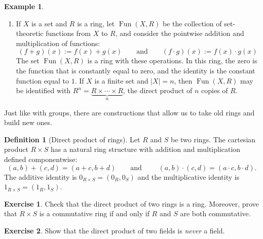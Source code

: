 \documentclass[12pt]{report}
\numberwithin{equation}{section}
\numberwithin{theorem}{chapter}
\theoremstyle{definition}
\newtheorem{definition}[theorem]{Definition}
\newtheorem{example}[theorem]{Example}
\newtheorem{exercise}{Exercise}
\newtheorem*{basic properties}{Basic Properties}
\newtheorem*{Important Remark}{Important Remark}
\newcommand{\df}[1]{{\bf #1}\index{#1}}
\DeclareMathOperator{\Fun}{Fun}
\begin{document}
\begin{example}
\begin{enumerate}[itemsep=0.2em,leftmargin=20pt]
This ring $\mathcal{H}$ is a division ring, since one can check that
$$(a + bi + cj + dk)^{-1} = \frac{a -  bi -  cj - dk}{\|a + bi + cj + dk\|}$$
where
$$\|a + bi + cj + dk \| := a^2 + b^2 + c^2 + d^2.$$
In the equation above, $\|a + bi + cj + dk \|$ is a nonzero real number if $a + bi + cj + dk$ is not the zero element. The quantity $\|a + bi + cj + dk \|$ is called the \df{norm} of the quaternion $a + bi + cj + dk$.



\item If $X$ is a set and $R$ is a ring, let $\Fun(X, R)$ be the collection of set-theoretic functions from $X$ to $R$, and consider the pointwise addition and multiplication of functions:
$$(f + g)(x) := f(x) + g(x) \qquad \text{and} \qquad (f \cdot g)(x) := f(x) \cdot g(x)$$
The set $\Fun(X,R)$ is a ring with these operations. In this ring, the zero is the function that is constantly equal to zero, and the identity is the constant function equal to $1$.
If $X$ is a finite set and $|X|=n$, then $\Fun(X,R)$ may be identified with $R^n=\underbrace{R \times \cdots \times R}_n$, the direct product of $n$ copies of $R$.
\end{enumerate}
\end{example}


Just like with groups, there are constructions that allow us to take old rings and build new ones.


\begin{definition}[Direct product of rings]
Let $R$ and $S$ be two rings.
The cartesian product $R\times S$ has a natural ring structure with addition and multiplication defined componentwise:
$$(a,b)+(c,d)=(a+c,b+d) \qquad \text{and } \qquad (a,b)\cdot(c,d)=(a\cdot c,b\cdot d).$$
The additive identity is $0_{R \times S} = (0_R, 0_{S})$ and the multiplicative identity is $1_{R \times S} = (1_R, 1_{S})$.
\end{definition}

\begin{exercise}
	Check that the direct product of two rings is a ring. Moreover, prove that $R \times S$ is a commutative ring if and only if $R$ and $S$ are both commutative.
\end{exercise}


\begin{exercise}
	Show that the direct product of two fields is \emph{never} a field.
\end{exercise}
\end{document}
